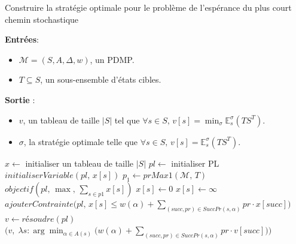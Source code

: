 \documentclass[12pt,a4paper]{report}
\theoremstyle{definition}%
\theoremstyle{remark}
\let\labelitemi\labelitemii
\begin{document}
\begin{algorithm}[H]
\caption{Construire la stratégie optimale pour le problème de l'espérance du plus court chemin stochastique}
\hspace*{\algorithmicindent} \textbf{Entrées}:
	\begin{itemize}
		\renewcommand{\labelitemi}{\tiny$\bullet$}
		\item $\mathcal{M} = (S, A, \Delta, w)$, un PDMP.
		\item $T \subseteq S$, un sous-ensemble d'états cibles.
	\end{itemize}
\hspace*{\algorithmicindent} \textbf{Sortie} :
\begin{itemize}
	\renewcommand{\labelitemi}{\tiny$\bullet$}
	\item $v$, un tableau de taille $|S|$ tel que $ \forall s \in S,\, v[s] = \min_{\sigma} \mathbb{E}_s^\sigma(TS^T)$.
	\item $\sigma$, la stratégie optimale telle que $\forall s \in S, \, v[s] = \mathbb{E}_s^\sigma(TS^T)$.
\end{itemize}
\begin{algorithmic}[1]
\STATE $x \gets$ initialiser un tableau de taille $|S|$
\STATE $pl \gets$ initialiser PL
	\STATE $initialiserVariable(pl,\, x[s])$
\ENDFOR
\STATE $p_1 \gets prMax1(\mathcal{M}, \, T)$
\STATE $objectif(pl,\, \max, \, \sum_{s \in p1} x[s])$
		\STATE $x[s] \gets 0$
		\STATE $x[s] \gets \infty$
	\ELSE
			\STATE $ajouterContrainte\big(pl,\, x[s] \leq w(\alpha) +  \sum_{(succ, pr) \in SuccPr(s, \alpha)} pr \cdot x[succ] \big)$
		\ENDFOR
	\ENDIF
\ENDFOR
\STATE $v \gets \textit{résoudre}(pl)$
\RETURN $\big(v, \; \lambda s: \arg \min_{\alpha \in A(s)} \big( w(\alpha) + \sum_{(succ, pr) \in SuccPr(s, \alpha)} pr \cdot v[succ] \big)\big)$
\end{algorithmic}
\end{algorithm}
\end{document}
